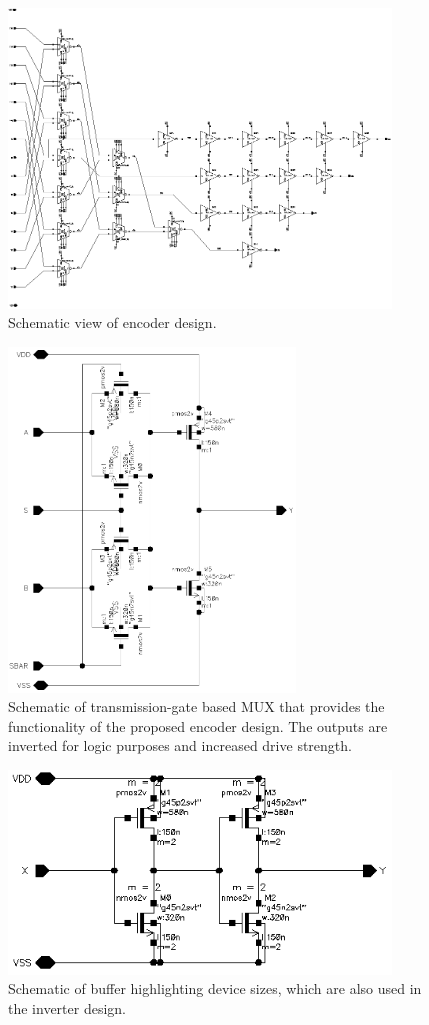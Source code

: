 \documentclass[11pt,letterpaper]{article}
\begin{document}
\begin{figure}[htbp!]
    \centering
    \includegraphics[width=4in]{encoder_old.eps}
    \caption{Schematic view of encoder design.}\label{Fig:encoder}
\end{figure}

\begin{figure}[htbp!]
    \centering
    \includegraphics[width=3in]{tgmux2.eps}
    \caption{Schematic of transmission-gate based MUX that provides the functionality of the proposed encoder design. The outputs are inverted for logic purposes and increased drive strength.}\label{Fig:tgmux2}
\end{figure}

\begin{figure}[htbp!]
    \centering
    \includegraphics[width=4in]{buf.eps}
    \caption{Schematic of buffer highlighting device sizes, which are also used in the inverter design.}\label{Fig:buf}
\end{figure}
\end{document}
